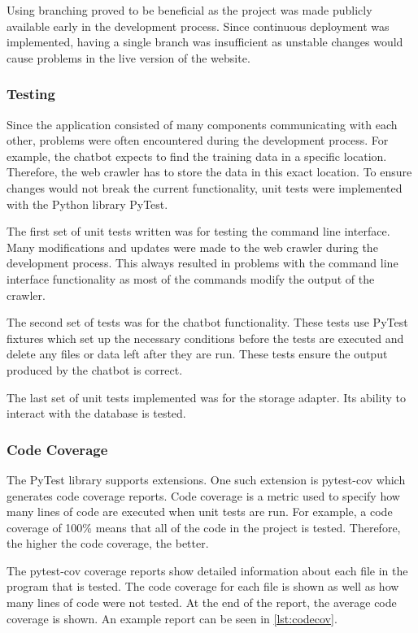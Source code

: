\documentclass[12pt,a4paper]{article}
\begin{document}
Using branching proved to be beneficial as the project was made publicly available early in the development process. Since continuous deployment was implemented, having a single branch was insufficient as unstable changes would cause problems in the live version of the website.

\subsubsection{Testing}
Since the application consisted of many components communicating with each other, problems were often encountered during the development process. For example, the chatbot expects to find the training data in a specific location. Therefore, the web crawler has to store the data in this exact location. To ensure changes would not break the current functionality, unit tests were implemented with the Python library PyTest. 

The first set of unit tests written was for testing the command line interface. Many modifications and updates were made to the web crawler during the development process. This always resulted in problems with the command line interface functionality as most of the commands modify the output of the crawler.

The second set of tests was for the chatbot functionality. These tests use PyTest fixtures which set up the necessary conditions before the tests are executed and delete any files or data left after they are run. These tests ensure the output produced by the chatbot is correct. 

The last set of unit tests implemented was for the storage adapter. Its ability to interact with the database is tested. 

\subsubsection{Code Coverage}
The PyTest library supports extensions. One such extension is pytest-cov which generates code coverage reports. Code coverage is a metric used to specify how many lines of code are executed when unit tests are run. For example, a code coverage of 100\% means that all of the code in the project is tested. Therefore, the higher the code coverage, the better. 

The pytest-cov coverage reports show detailed information about each file in the program that is tested. The code coverage for each file is shown as well as how many lines of code were not tested. At the end of the report, the average code coverage is shown. An example report can be seen in \cref{lst:codecov}.
\end{document}
